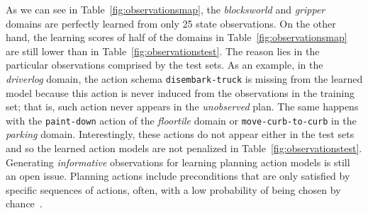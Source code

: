 \documentclass{article}
\begin{document}
As we can see in Table~\ref{fig:observationsmap}, the {\em blocksworld} and {\em gripper} domains are perfectly learned from only 25 state observations. On the other hand, the learning scores of half of the domains in Table~\ref{fig:observationsmap} are still lower than in Table~\ref{fig:observationstest}. The reason lies in the particular observations comprised by the test sets.
As an example, in the {\em driverlog} domain, the action schema {\small \tt disembark-truck} is missing from the learned model because this action is never induced from the observations in the training set; that is, such action never appears in the \emph{unobserved} plan. The same happens with the {\small \tt paint-down} action of the {\em floortile} domain or {\small \tt move-curb-to-curb} in the {\em parking} domain. Interestingly, these actions do not appear either in the test sets and so the learned action models are not penalized in Table~\ref{fig:observationstest}. Generating {\em informative} observations for learning planning action models is still an open issue. Planning actions include preconditions that are only satisfied by specific sequences of actions, often, with a low probability of being chosen by chance~\cite{fern2004learning}.

\end{document}
